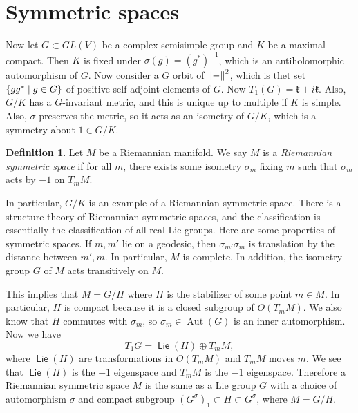 \documentclass[leqno, openany]{memoir}
\theoremstyle{definition}
\newtheorem{defn}[thm]{Definition}
\theoremstyle{remark}
\theoremstyle{plain}
\theoremstyle{definition}
\theoremstyle{remark}
\newcommand{\mf}[1]{\mathfrak{#1}}
\DeclareMathOperator{\Aut}{Aut}
\DeclareMathOperator{\Lie}{\mathsf{Lie}}
\begin{document}
\section{Symmetric spaces}%

Now let $G \subset GL(V)$ be a complex semisimple group and $K$ be a maximal
compact. Then $K$ is fixed under $\sigma(g) = {(g^*)}^{-1}$, which is an
antiholomorphic automorphism of $G$. Now consider a $G$ orbit of $\norm{-}^2$,
which is thet set $\qty{gg^* \mid g \in G}$ of positive self-adjoint elements
of $G$. Now $T_1(G) = \mf{k} + i \mf{k}$. Also, $G/K$ has a $G$-invariant
metric, and this is unique up to multiple if $K$ is simple. Also, $\sigma$
preserves the metric, so it acts as an isometry of $G/K$, which is a symmetry
about $1 \in G/K$.

\begin{defn} Let $M$ be a Riemannian manifold. We say $M$ is a
\textit{Riemannian symmetric space} if for all $m$, there exists some isometry
$\sigma_m$ fixing $m$ such that $\sigma_m$ acts by $-1$ on $T_m M$.  \end{defn}

In particular, $G/K$ is an example of a Riemannian symmetric space. There is a
structure theory of Riemannian symmetric spaces, and the classification is
essentially the classification of all real Lie groups. Here are some properties
of symmetric spaces. If $m, m'$ lie on a geodesic, then $\sigma_{m'} \sigma_m$
is translation by the distance between $m', m$. In particular, $M$ is complete.
In addition, the isometry group $G$ of $M$ acts transitively on $M$.

This implies that $M = G/H$ where $H$ is the stabilizer of some point $m \in
M$. In particular, $H$ is compact because it is a closed subgroup of $O(T_m
M)$. We also know that $H$ commutes with $\sigma_m$, so $\sigma_m \in \Aut(G)$
is an inner automorphism. Now we have \[ T_1 G = \Lie(H) \oplus T_m M, \] where
$\Lie(H)$ are transformations in $O(T_m M)$ and $T_m M$ moves $m$. We see that
$\Lie(H)$ is the $+1$ eigenspace and $T_m M$ is the $-1$ eigenspace. Therefore
a Riemannian symmetric space $M$ is the same as a Lie group $G$ with a choice
of automorphism $\sigma$ and compact subgroup ${(G^{\sigma})}_1 \subset H
\subset G^{\sigma}$, where $M = G/H$.
\end{document}

